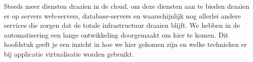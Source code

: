 Steeds meer diensten draaien in de cloud, om deze diensten aan te bieden draaien er op servers web-servers, database-servers en waarschijnlijk nog allerlei andere services die zorgen dat de totale infrastructuur draaien blijft. We hebben in de automatisering een lange ontwikkeling doorgemaakt om hier te komen. Dit hoofdstuk geeft je een inzicht in hoe we hier gekomen zijn en welke technieken er bij applicatie virtualisatie worden gebruikt.
